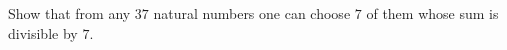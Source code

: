 Show that from any \(37\) natural numbers one can choose \(7\) of them whose sum is divisible by \(7\).
